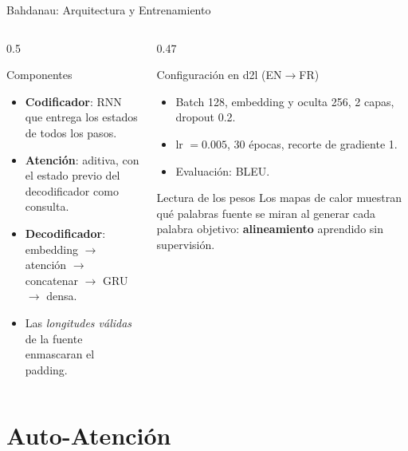 \documentclass[aspectratio=169, 10pt]{beamer}
\begin{document}
\begin{frame}{Bahdanau: Arquitectura y Entrenamiento}
	\begin{columns}[T]
		\begin{column}{0.5\textwidth}
			\begin{block}{Componentes}
				\small
				\begin{itemize}
					\item \textbf{Codificador}: RNN que entrega los estados de todos los pasos.
					\item \textbf{Atenci\'on}: aditiva, con el estado previo del decodificador como consulta.
					\item \textbf{Decodificador}: embedding $\to$ atenci\'on $\to$ concatenar $\to$ GRU $\to$ densa.
					\item Las \emph{longitudes v\'alidas} de la fuente enmascaran el padding.
				\end{itemize}
			\end{block}
		\end{column}
		\begin{column}{0.47\textwidth}
			\begin{block}{Configuraci\'on en d2l (EN$\to$FR)}
				\small
				\begin{itemize}
					\item Batch 128, embedding y oculta 256, 2 capas, dropout 0.2.
					\item lr $=0.005$, 30 \'epocas, recorte de gradiente 1.
					\item Evaluaci\'on: BLEU.
				\end{itemize}
			\end{block}
			\begin{alertblock}{Lectura de los pesos}
				\small
				Los mapas de calor muestran qu\'e palabras fuente se miran al generar cada palabra objetivo: \textbf{alineamiento} aprendido sin supervisi\'on.
			\end{alertblock}
		\end{column}
	\end{columns}
\end{frame}

\section{Auto-Atenci\'on}
\end{document}
